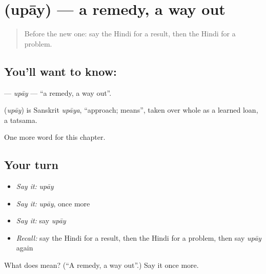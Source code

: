 \section[\texorpdfstring{\hi{उपाय} (upāy)}{उपाय (upāy)}]{ (upāy) — a remedy, a way out}

\label{lesson:HI-C222-upay}



\begin{quote}
Before the new one: say the Hindi for a result, then the Hindi for a problem.
\end{quote}

\subsection*{You'll want to know: }
\textbf{} — \emph{upāy} — \textquotedblleft{}a remedy, a way out\textquotedblright{}.

\begin{cousinweb}
\textbf{} (\emph{upāy}) is Sanskrit \emph{upāya}, \textquotedblleft{}approach; means\textquotedblright{}, taken over whole as a learned loan, a tatsama.
\end{cousinweb}

\begin{grammarlens}[title={What you've built}]
One more word for this chapter.
\end{grammarlens}

\subsection*{Your turn}
\begin{itemize}
\raggedright
  \item \emph{Say it:} \emph{upāy}
  \item \emph{Say it:} \emph{upāy}, once more
  \item \emph{Say it:} say \emph{upāy}
  \item \emph{Recall:} say the Hindi for a result, then the Hindi for a problem, then say \emph{upāy} again
\end{itemize}

\begin{tcolorbox}[breakable,colback=teal!4,colframe=teal!35!black,title={Before you move on}]
What does  mean? (\textquotedblleft{}A remedy, a way out\textquotedblright{}.) Say it once more.
\end{tcolorbox}
